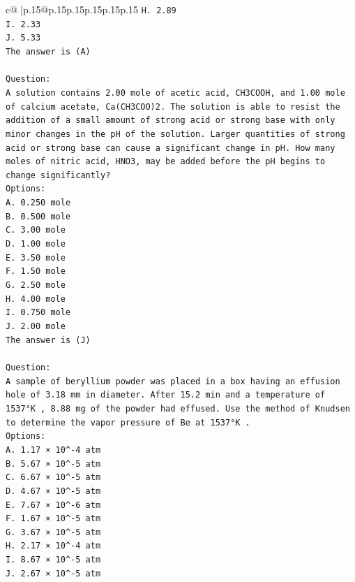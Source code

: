 \documentclass{article}
\begin{document}
{\begin{supertabular}{c@{$\;$}|p{.15\linewidth}@{}p{.15\linewidth}p{.15\linewidth}p{.15\linewidth}p{.15\linewidth}p{.15\linewidth}}
{{{\texttt{H. 2.89} \\
\texttt{I. 2.33} \\
\texttt{J. 5.33} \\
\texttt{The answer is (A)} \\
\\ 
\texttt{Question:} \\
\texttt{A solution contains 2.00 mole of acetic acid, CH3COOH, and 1.00 mole of calcium acetate, Ca(CH3COO)2. The solution is able to resist the addition of a small amount of strong acid or strong base with only minor changes in the pH of the solution. Larger quantities of strong acid or strong base can cause a significant change in pH. How many moles of nitric acid, HNO3, may be added before the pH begins to change significantly?} \\
\texttt{Options:} \\
\texttt{A. 0.250 mole} \\
\texttt{B. 0.500 mole} \\
\texttt{C. 3.00 mole} \\
\texttt{D. 1.00 mole} \\
\texttt{E. 3.50 mole} \\
\texttt{F. 1.50 mole} \\
\texttt{G. 2.50 mole} \\
\texttt{H. 4.00 mole} \\
\texttt{I. 0.750 mole} \\
\texttt{J. 2.00 mole} \\
\texttt{The answer is (J)} \\
\\ 
\texttt{Question:} \\
\texttt{A sample of beryllium powder was placed in a box having an effusion hole of 3.18 mm in diameter. After 15.2 min and a temperature of 1537°K , 8.88 mg of the powder had effused. Use the method of Knudsen to determine the vapor pressure of Be at 1537°K .} \\
\texttt{Options:} \\
\texttt{A. 1.17 × 10\^{}{-}4 atm} \\
\texttt{B. 5.67 × 10\^{}{-}5 atm} \\
\texttt{C. 6.67 × 10\^{}{-}5 atm} \\
\texttt{D. 4.67 × 10\^{}{-}5 atm} \\
\texttt{E. 7.67 × 10\^{}{-}6 atm} \\
\texttt{F. 1.67 × 10\^{}{-}5 atm} \\
\texttt{G. 3.67 × 10\^{}{-}5 atm} \\
\texttt{H. 2.17 × 10\^{}{-}4 atm} \\
\texttt{I. 8.67 × 10\^{}{-}5 atm} \\
\texttt{J. 2.67 × 10\^{}{-}5 atm} \\
            }
        }
    }
     \\ \\


\end{supertabular}}
\end{document}
